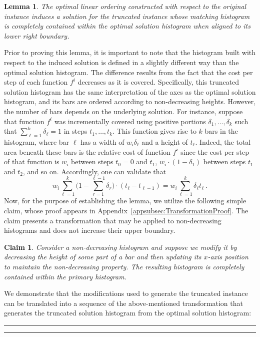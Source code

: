 \documentclass[11pt]{article}
\theoremstyle{plain}
\newtheorem{lemma}[theorem]{Lemma}
\newtheorem{claim}[theorem]{Claim}
\theoremstyle{definition}
\newcommand{\qedsymb}{\hfill{\rule{2mm}{2mm}}}
\renewenvironment{proof}{\begin{trivlist} \item[\hspace{\labelsep}{\bf \noindent Proof.\/}] }{\qedsymb\end{trivlist}}\newenvironment{proofof}[1]{\begin{trivlist} \item[\hspace{\labelsep}{\bf \noindent Proof of #1.\/}] }{\qedsymb\end{trivlist}}\newenvironment{MyEqn}[1]{\setlength\arraycolsep{2pt}\begin{eqnarray*} #1}{\end{eqnarray*}}
\begin{document}
\begin{proof}
\begin{lemma} \label{lemma:Truncated}
The optimal linear ordering constructed with respect to the
original instance induces a solution for the truncated instance
whose matching histogram is completely contained within the
optimal solution histogram when aligned to its lower right
boundary.
\end{lemma}
\begin{proof}
Prior to proving this lemma, it is important to note that the
histogram built with respect to the induced solution is defined in
a slightly different way than the optimal solution histogram. The
difference results from the fact that the cost per step of each
function $f^i$ decreases as it is covered. Specifically, this
truncated solution histogram has the same interpretation of the
axes as the optimal solution histogram, and its bars are ordered
according to non-decreasing heights. However, the number of bars
depends on the underlying solution. For instance, suppose that
function $f^i$ was incrementally covered using positive portions
$\delta_1, \ldots, \delta_k$ such that $\sum_{\ell = 1}^k
\delta_\ell = 1$ in steps $t_1, \ldots, t_k$. This function gives
rise to $k$ bars in the histogram, where bar $\ell$ has a width of
$w_i \delta_\ell$ and a height of $t_\ell$. Indeed, the total area
beneath these bars is the relative cost of function $f^i$ since
the cost per step of that function is $w_i$ between steps $t_0 =
0$ and $t_1$, $w_i \cdot (1 - \delta_1)$ between steps $t_1$ and
$t_2$, and so on. Accordingly, one can validate that
$$
w_i \sum_{\ell = 1}^k  \Big(1 - \sum_{r = 1}^{\ell - 1}
\delta_r\Big) \cdot (t_\ell - t_{\ell-1}) = w_i \sum_{\ell = 1}^k
\delta_\ell t_\ell \ .
$$
Now, for the purpose of establishing the lemma, we utilize the
following simple claim, whose proof appears in
Appendix~\ref{appsubsec:TransformationProof}. The claim presents a
transformation that may be applied to non-decreasing histograms
and does not increase their upper boundary.

\begin{claim} \label{claim:Transformation}
Consider a non-decreasing histogram and suppose we modify it by
decreasing the height of some part of a bar and then updating its
$x$-axis position to maintain the non-decreasing property. The
resulting histogram is completely contained within the primary
histogram.
\end{claim}

We demonstrate that the modifications used to generate the
truncated instance can be translated into a sequence of the
above-mentioned transformation that generates the truncated
solution histogram from the optimal solution histogram:


\end{proof}
\end{proof}
\end{document}

